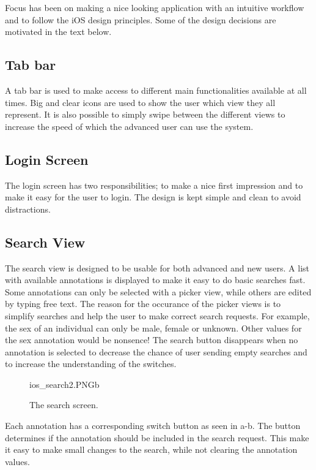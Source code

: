 Focus has been on making a nice looking application with an intuitive workflow and to follow the iOS design principles. Some of the design decisions are motivated in the text below.

\subsection{Tab bar}
A tab bar is used to make access to different main functionalities available at all times. Big and clear icons are used to show the user which view they all represent. It is also possible to simply swipe between the different views to increase the speed of which the advanced user can use the system.

\subsection{Login Screen}
The login screen has two responsibilities; to make a nice first impression and to make it easy for the user to login. The design is kept simple and clean to avoid distractions.

\subsection{Search View}
The search view is designed to be usable for both advanced and new users. A list with available annotations is displayed to make it easy to do basic searches fast. Some annotations can only be selected with a picker view, while others are edited by typing free text. The reason for the occurance of the picker views is to simplify searches and help the user to make correct search requests. For example, the sex of an individual can only be male, female or unknown. Other values for the sex annotation would be nonsence! The search button disappears when no annotation is selected to decrease the chance of user sending empty searches and to increase the understanding of the switches. 

\begin{figure}[ht]
		{ios_search2.PNG}{b}
\caption{The search screen.}
\label{fig:ios_search2}
\end{figure}
\FloatBarrier

Each annotation has a corresponding switch button as seen in a-b. The button determines if the annotation should be included in the search request. This make it easy to make small changes to the search, while not clearing the annotation values.

